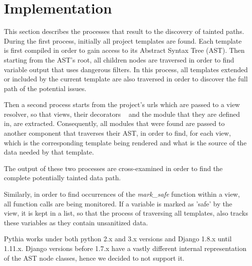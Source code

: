 \section{Implementation}
This section describes the processes that result to the discovery of tainted paths. During the first process, initially all project templates are found. Each template is first compiled in order to gain access to its Abstract Syntax Tree (AST). Then starting from the AST's root, all children nodes are traversed in order to find variable output that uses dangerous filters. In this process, all templates extended or included by the current template are also traversed in order to discover the full path of the potential issues.

Then a second process starts from the project's urls which are passed to a view resolver, so that views, their decorators ~\cite{django_decorators} and the module that they are defined in, are extracted. Consequently, all modules that were found are passed to another component that traverses their AST, in order to find, for each view, which is the corresponding template being rendered and what is the source of the data needed by that template.

The output of these two processes are cross-examined in order to find the complete potentially tainted data path.

Similarly, in order to find occurrences of the \emph{mark\_safe} function within a view, all function calls are being monitored. If a variable is marked as 'safe' by the view, it is kept in a list, so that the process of traversing all templates, also tracks these variables as they contain unsanitized data. 

Pythia works under both python 2.x and 3.x versions and Django 1.8.x until 1.11.x. Django versions before 1.7.x have a vastly different internal representation of the AST node classes, hence we decided to not support it.

\begin{comment}

\end{comment}
